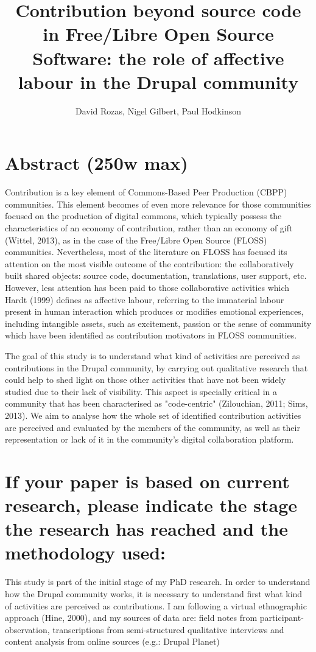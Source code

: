 \documentclass[10pt,a4paper]{article}
\author{David Rozas, Nigel Gilbert, Paul Hodkinson}
\title{Contribution beyond source code in Free/Libre Open Source Software: the role of affective labour in the Drupal community}
\begin{document}
\maketitle

\texttt{}
\section{Abstract (250w max)}
Contribution is a key element of Commons-Based Peer Production (CBPP) communities. This element becomes of even more relevance for those communities focused on the production of digital commons, which typically possess the characteristics of an economy of contribution, rather than an economy of gift (Wittel, 2013), as in the case of the Free/Libre Open Source (FLOSS) communities. Nevertheless, most of the literature on FLOSS has focused its attention on the most visible outcome of the contribution: the collaboratively built shared objects: source code, documentation, translations, user support, etc. However, less attention has been paid to those collaborative activities which Hardt (1999) defines as affective labour, referring to the  immaterial labour present in human interaction which produces or modifies emotional experiences, including intangible assets, such as excitement, passion or the sense of community which have been identified as contribution motivators in FLOSS communities.

The goal of this study is to understand what kind of activities are perceived as contributions in the Drupal community, by carrying out qualitative research that could help to shed light on those other activities that have not been widely studied due to their lack of visibility. This aspect is specially critical in a community that has been characterised as "code-centric" (Zilouchian, 2011; Sims, 2013). We aim to analyse how the whole set of identified contribution activities are perceived and evaluated by the members of the community, as well as their representation or lack of it in the community's digital collaboration platform.

\section{If your paper is based on current research, please indicate the stage the research has reached and the methodology used:}

This study is part of the initial stage of my PhD research. In order to understand how  the Drupal community works, it is necessary to understand first what kind of activities are perceived as contributions. I am following a virtual ethnographic approach (Hine, 2000), and my sources of data are: field notes from participant-observation, transcriptions from semi-structured qualitative interviews and content analysis from online sources (e.g.: Drupal Planet)
\end{document}
